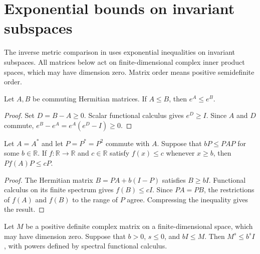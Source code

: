 \section{Exponential bounds on invariant subspaces}

The inverse metric comparison in \cite[Section~8]{OpenAI2026AreaLaw}
uses exponential inequalities on invariant subspaces. All matrices below
act on finite-dimensional complex inner product spaces, which may have
dimension zero. Matrix order means positive semidefinite order.

\begin{theorem}
  \label{thm:commuting_exponential_order}
  \leanok
  Let $A,B$ be commuting Hermitian matrices. If $A\leq B$, then
  $e^A\leq e^B$.
\end{theorem}
\begin{proof}
  \leanok
  Set $D=B-A\geq0$. Scalar functional calculus gives $e^D\geq I$.
  Since $A$ and $D$ commute, $e^B-e^A=e^A(e^D-I)\geq0$.
\end{proof}

\begin{theorem}
  \label{thm:invariant_range_functional_bound}
  \leanok
  Let $A=A^*$ and let $P=P^*=P^2$ commute with $A$. Suppose that
  $bP\leq PAP$ for some $b\in\mathbb R$. If $f\colon\mathbb R\to\mathbb R$
  and $c\in\mathbb R$ satisfy $f(x)\leq c$ whenever $x\geq b$, then
  $Pf(A)P\leq cP$.
\end{theorem}
\begin{proof}
  \leanok
  The Hermitian matrix $B=PA+b(I-P)$ satisfies $B\geq bI$.
  Functional calculus on its finite spectrum gives $f(B)\leq cI$.
  Since $PA=PB$, the restrictions of $f(A)$ and $f(B)$ to the range
  of $P$ agree. Compressing the inequality gives the result.
\end{proof}

\begin{theorem}
    \label{thm:scalar_floor_nonpositive_power}
    \leanok
    Let $M$ be a positive definite complex matrix on a finite-dimensional
    space, which may have dimension zero. Suppose that $b>0$, $s\le0$,
    and $bI\le M$. Then $M^s\le b^sI$, with powers defined by spectral
    functional calculus.
\end{theorem}

